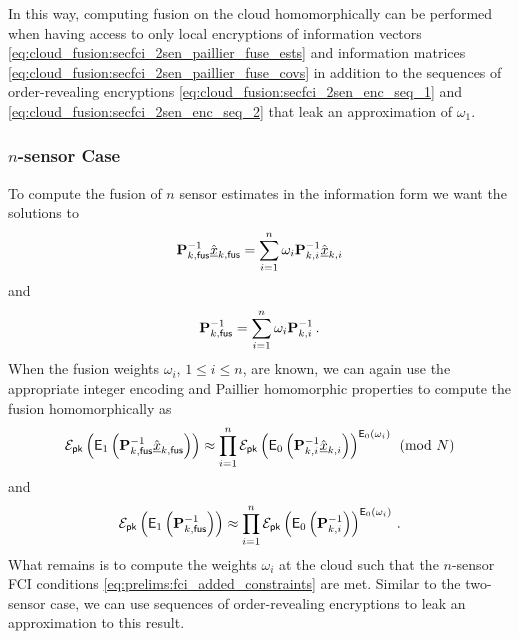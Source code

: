 In this way, computing fusion on the cloud homomorphically can be performed when having access to only local encryptions of information vectors \eqref{eq:cloud_fusion:secfci_2sen_paillier_fuse_ests} and information matrices \eqref{eq:cloud_fusion:secfci_2sen_paillier_fuse_covs} in addition to the sequences of order-revealing encryptions \eqref{eq:cloud_fusion:secfci_2sen_enc_seq_1} and \eqref{eq:cloud_fusion:secfci_2sen_enc_seq_2} that leak an approximation of $\omega_1$.

% 
% 

\subsubsection{$n$-sensor Case}\label{subsubsec:cloud_fusion:secfci_n_sen}
To compute the fusion of $n$ sensor estimates in the information form we want the solutions to
\begin{equation}
    {\ensuremath{{\mathbf{P}}}}_{k,\mathsf{fus}}^{-1}\hat{{\underline{x}}}_{k,\mathsf{fus}} = \sum_{i=1}^n\omega_i{{\mathbf{P}}}_{k,i}^{-1}\hat{{\underline{x}}}_{k,i}
\end{equation}
and
\begin{equation}
    {\ensuremath{{\mathbf{P}}}}_{k,\mathsf{fus}}^{-1} = \sum_{i=1}^n\omega_i{{\mathbf{P}}}_{k,i}^{-1}\,.
\end{equation}
When the fusion weights $\omega_i$, $1\leq i\leq n$, are known, we can again use the appropriate integer encoding and Paillier homomorphic properties to compute the fusion homomorphically as
\begin{equation}\label{eq:cloud_fusion:secfci_nsen_paillier_fuse_ests}
    \mathcal{E}_{\mathsf{pk}}\left(\mathsf{E}_1\left({{\mathbf{P}}}_{k,\mathsf{fus}}^{-1}\hat{{\underline{x}}}_{k,\mathsf{fus}}\right)\right) \approx \prod_{i=1}^n\mathcal{E}_{\mathsf{pk}}\left(\mathsf{E}_0\left({{\mathbf{P}}}^{-1}_{k,i}\hat{{\underline{x}}}_{k,i}\right)\right)^{\mathsf{E}_0(\omega_i)}\pmod{N}
\end{equation}
and
\begin{equation}\label{eq:cloud_fusion:secfci_nsen_paillier_fuse_covs}
    \mathcal{E}_{\mathsf{pk}}\left(\mathsf{E}_1\left({{\mathbf{P}}}_{k,\mathsf{fus}}^{-1}\right)\right) \approx \prod_{i=1}^n\mathcal{E}_{\mathsf{pk}}\left(\mathsf{E}_0\left({{\mathbf{P}}}^{-1}_{k,i}\right)\right)^{\mathsf{E}_0(\omega_i)}\,.
\end{equation}
What remains is to compute the weights $\omega_i$ at the cloud such that the $n$-sensor FCI conditions \eqref{eq:prelims:fci_added_constraints} are met. Similar to the two-sensor case, we can use sequences of order-revealing encryptions to leak an approximation to this result. 

